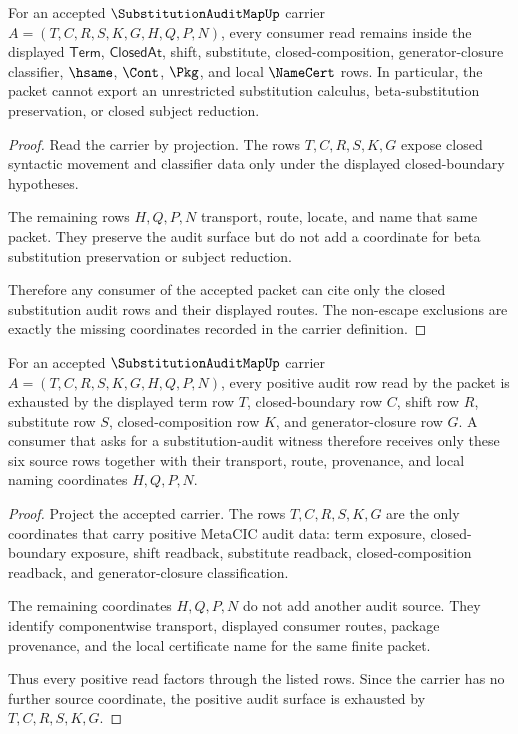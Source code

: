 \begin{theorem}
\label{thm:substitution-audit-map-boundary-nonescape}
For an accepted $\SubstitutionAuditMapUp$ carrier $A=(T,C,R,S,K,G,H,Q,P,N)$, every consumer read remains inside the displayed $\mathsf{Term}$, $\mathsf{ClosedAt}$, shift, substitute, closed-composition, generator-closure classifier, $\hsame$, $\Cont$, $\Pkg$, and local $\NameCert$ rows. In particular, the packet cannot export an unrestricted substitution calculus, beta-substitution preservation, or closed subject reduction.
\end{theorem}
\begin{proof}
Read the carrier by projection. The rows $T,C,R,S,K,G$ expose closed syntactic movement and classifier data only under the displayed closed-boundary hypotheses.

The remaining rows $H,Q,P,N$ transport, route, locate, and name that same packet. They preserve the audit surface but do not add a coordinate for beta substitution preservation or subject reduction.

Therefore any consumer of the accepted packet can cite only the closed substitution audit rows and their displayed routes. The non-escape exclusions are exactly the missing coordinates recorded in the carrier definition.
\end{proof}

\begin{theorem}
\label{thm:substitutionauditmap-positive-row-coverage}
For an accepted $\SubstitutionAuditMapUp$ carrier $A=(T,C,R,S,K,G,H,Q,P,N)$, every positive audit row read by the packet is exhausted by the displayed term row $T$, closed-boundary row $C$, shift row $R$, substitute row $S$, closed-composition row $K$, and generator-closure row $G$. A consumer that asks for a substitution-audit witness therefore receives only these six source rows together with their transport, route, provenance, and local naming coordinates $H,Q,P,N$.
\end{theorem}
\begin{proof}
Project the accepted carrier. The rows $T,C,R,S,K,G$ are the only coordinates that carry positive MetaCIC audit data: term exposure, closed-boundary exposure, shift readback, substitute readback, closed-composition readback, and generator-closure classification.

The remaining coordinates $H,Q,P,N$ do not add another audit source. They identify componentwise transport, displayed consumer routes, package provenance, and the local certificate name for the same finite packet.

Thus every positive read factors through the listed rows. Since the carrier has no further source coordinate, the positive audit surface is exhausted by $T,C,R,S,K,G$.
\end{proof}

